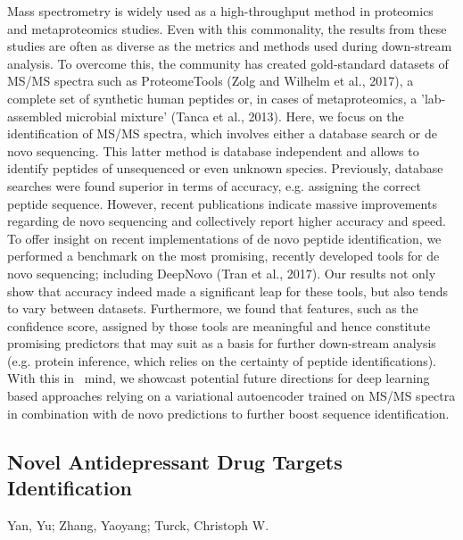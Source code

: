 {Mass spectrometry is widely used as a high-throughput method in proteomics and metaproteomics studies. Even with this commonality, the results from these studies are often as diverse as the metrics and methods used during down-stream analysis. To overcome this, the community has created gold-standard datasets of MS/MS spectra such as ProteomeTools (Zolg and Wilhelm et al., 2017), a complete set of synthetic human peptides or, in cases of metaproteomics, a ’lab-assembled microbial mixture’ (Tanca et al., 2013). Here, we focus on the identification of MS/MS spectra, which involves either a database search or de novo sequencing. This latter method is database independent and allows to identify peptides of unsequenced or even unknown species. Previously, database searches were found superior in terms of accuracy, e.g. assigning the correct peptide sequence. However, recent publications indicate massive improvements regarding de novo sequencing and collectively report higher accuracy and speed. To offer insight on recent implementations of de novo peptide identification, we performed a benchmark on the most promising, recently developed tools for de novo sequencing; including DeepNovo (Tran et al., 2017). Our results not only show that accuracy indeed made a significant leap for these tools, but also tends to vary between datasets. Furthermore, we found that features, such as the confidence score, assigned by those tools are meaningful and hence constitute promising predictors that may suit as a basis for further down-stream analysis (e.g. protein inference, which relies on the certainty of peptide identifications). With this in  mind, we showcast potential future directions for deep learning based approaches relying on a variational autoencoder trained on MS/MS spectra in combination with de novo predictions to further boost sequence identification.


\subsection*{\color{eubicRed} Novel Antidepressant Drug Targets Identification}
{\color{eubicGray}Yan, Yu;
Zhang, Yaoyang;
Turck, Christoph W.}

}
